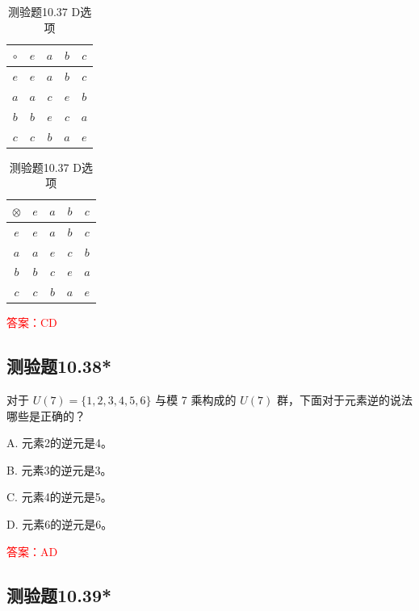 \documentclass[UTF8, heading=true]{ctexart}
\begin{document}
\begin{table}[H]
  \renewcommand{\arraystretch}{1.3}
  \begin{minipage}{0.45\linewidth}
    \centering
    \begin{tabular}{c|cccc}
      \hline$\circ$ & $e$ & $a$ & $b$ & $c$ \\
      \hline$e$ & $e$ & $a$ & $b$ & $c$ \\
      $a$ & $a$ & $c$ & $e$ & $b$ \\
      $b$ & $b$ & $e$ & $c$ & $a$ \\
      $c$ & $c$ & $b$ & $a$ & $e$ \\
      \hline
    \end{tabular}    
    \vspace{0.5cm}
    \caption{测验题10.37 C选项}
  \end{minipage}
  \hfill
  \begin{minipage}{0.45\linewidth}
    \centering
    \begin{tabular}{c|cccc}
      \hline$\otimes$ & $e$ & $a$ & $b$ & $c$ \\
      \hline$e$ & $e$ & $a$ & $b$ & $c$ \\
      $a$ & $a$ & $e$ & $c$ & $b$ \\
      $b$ & $b$ & $c$ & $e$ & $a$ \\
      $c$ & $c$ & $b$ & $a$ & $e$ \\
      \hline
    \end{tabular}
    \vspace{0.5cm}
    \caption{测验题10.37 D选项}
  \end{minipage}
\end{table}

\textcolor{red}{答案：CD}

\subsection{测验题10.38*}

对于 $U(7)=\{1,2,3,4,5,6\}$ 与模 7 乘构成的 $U(7)$ 群，下面对于元素逆的说法哪些是正确的？

A. 元素2的逆元是4。

B. 元素3的逆元是3。

C. 元素4的逆元是5。

D. 元素6的逆元是6。

\textcolor{red}{答案：AD}

\subsection{测验题10.39*}
\end{document}
